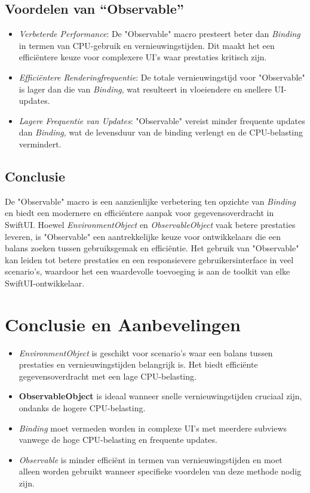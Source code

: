 \subsection{Voordelen van ``Observable''}
\begin{itemize}
    \item \textit{Verbeterde Performance}: De "Observable" macro presteert beter dan \textit{Binding} in termen van CPU-gebruik en vernieuwingstijden. Dit maakt het een efficiëntere keuze voor complexere UI's waar prestaties kritisch zijn.
    \item \textit{Efficiëntere Renderingfrequentie}: De totale vernieuwingstijd voor "Observable" is lager dan die van \textit{Binding}, wat resulteert in vloeiendere en snellere UI-updates.
    \item \textit{Lagere Frequentie van Updates}: "Observable" vereist minder frequente updates dan \textit{Binding}, wat de levensduur van de binding verlengt en de CPU-belasting vermindert.
\end{itemize}

\subsection{Conclusie}
De "Observable" macro is een aanzienlijke verbetering ten opzichte van \textit{Binding} en biedt een modernere en efficiëntere aanpak voor gegevensoverdracht in SwiftUI. Hoewel \textit{EnvironmentObject} en \textit{ObservableObject} vaak betere prestaties leveren, is "Observable" een aantrekkelijke keuze voor ontwikkelaars die een balans zoeken tussen gebruiksgemak en efficiëntie. Het gebruik van "Observable" kan leiden tot betere prestaties en een responsievere gebruikersinterface in veel scenario's, waardoor het een waardevolle toevoeging is aan de toolkit van elke SwiftUI-ontwikkelaar.


\newpage
\section{Conclusie en Aanbevelingen}
\begin{itemize}
    \item \textit{EnvironmentObject} is geschikt voor scenario's waar een balans tussen prestaties en vernieuwingstijden belangrijk is. Het biedt efficiënte gegevensoverdracht met een lage CPU-belasting.
    \item \textbf{ObservableObject} is ideaal wanneer snelle vernieuwingstijden cruciaal zijn, ondanks de hogere CPU-belasting.
    \item \textit{Binding} moet vermeden worden in complexe UI's met meerdere subviews vanwege de hoge CPU-belasting en frequente updates.
    \item \textit{Observable} is minder efficiënt in termen van vernieuwingstijden en moet alleen worden gebruikt wanneer specifieke voordelen van deze methode nodig zijn.
\end{itemize}

